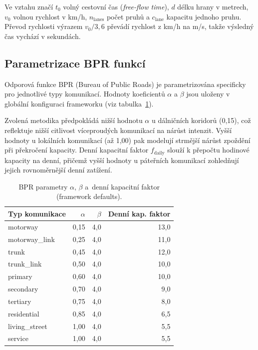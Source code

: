 Ve vztahu značí $t_0$ volný cestovní čas (\emph{free-flow time}), $d$ délku hrany v metrech, $v_0$ volnou rychlost v km/h, $n_{\mathrm{lanes}}$ počet pruhů a $c_{\mathrm{lane}}$ kapacitu jednoho pruhu. Převod rychlosti výrazem $v_0 / 3{,}6$ převádí rychlost z km/h na m/s, takže výsledný čas vychází v sekundách.

\subsection{Parametrizace BPR funkcí}
\label{sec:impl-network-bpr}

Odporová funkce BPR (Bureau of Public Roads) je parametrizována specificky pro jednotlivé typy komunikací. Hodnoty koeficientů $\alpha$ a $\beta$ jsou uloženy v globální konfiguraci frameworku (viz tabulka~\ref{tab:bpr-params}). 

Zvolená metodika předpokládá nižší hodnotu $\alpha$ u dálničních koridorů (0,15), což reflektuje nižší citlivost víceproudých komunikací na nárůst intenzit. Vyšší hodnoty u lokálních komunikací (až 1,00) pak modelují strmější nárůst zpoždění při překročení kapacity. Denní kapacitní faktor $f_\mathrm{daily}$ slouží k přepočtu hodinové kapacity na denní, přičemž vyšší hodnoty u páteřních komunikací zohledňují jejich rovnoměrnější denní zatížení.

\begin{table}[ht]
\centering
\label{tab:bpr-params}
\begin{tabular}{lrrr}
\toprule
\textbf{Typ komunikace} & $\alpha$ & $\beta$ & \textbf{Denní kap. faktor} \\
\midrule
motorway       & 0,15 & 4,0 & 13,0 \\
motorway\_link & 0,25 & 4,0 & 11,0 \\
trunk          & 0,45 & 4,0 & 12,0 \\
trunk\_link    & 0,50 & 4,0 & 10,0 \\
primary        & 0,60 & 4,0 & 10,0 \\
secondary      & 0,70 & 4,0 & 9,0  \\
tertiary       & 0,75 & 4,0 & 8,0  \\
residential    & 0,85 & 4,0 & 6,5  \\
living\_street & 1,00 & 4,0 & 5,5  \\
service        & 1,00 & 4,0 & 5,5  \\
\bottomrule
\end{tabular}
\caption{BPR parametry $\alpha$, $\beta$ a~denní kapacitní faktor (framework defaults).}
\end{table}

